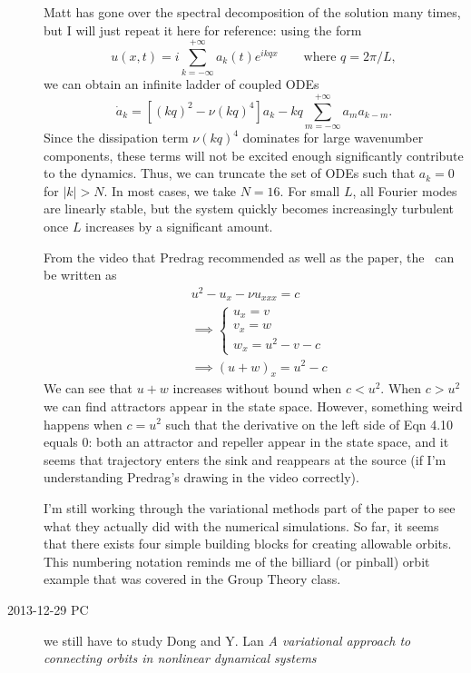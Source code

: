 \begin{description}
{Matt has gone over the spectral decomposition of the solution many times, but I
will just repeat it here for reference: using the form
\begin{equation}
    u(x,t) = i \sum_{k=-\infty}^{+\infty} a_k(t) e^{ikqx} \qquad \text{where } q = 2\pi/L,
\end{equation}
we can obtain an infinite ladder of coupled ODEs
\begin{equation}
    \dot{a}_k = [(kq)^2 - \nu (kq)^4] a_k - kq \sum_{m=-\infty}^{+\infty} a_m a_{k-m}.
\end{equation}
Since the dissipation term $\nu (kq)^4$ dominates for large wavenumber components, these
terms will not be excited enough significantly contribute to the dynamics. Thus, we can
truncate the set of ODEs such that $a_k = 0$ for $|k|>N$. In most cases, we take $N = 16$.
For small $L$, all Fourier modes are linearly stable, but the system quickly becomes
increasingly turbulent once $L$ increases by a significant amount.

From the video that Predrag recommended as well as the paper, the \KSe\ can be written as
\begin{align}
    &u^2 - u_x - \nu u_{xxx} = c\\
    &\implies \left\{
    \begin{array}{l}
	u_x = v\\
	v_x = w\\
	w_x = u^2 - v - c
    \end{array}
    \right.\\
    &\implies (u+w)_x = u^2 - c
\end{align}
We can see that $u+w$ increases without bound when $c<u^2$. When $c>u^2$ we can find
attractors appear in the state space. However, something weird happens when $c = u^2$
such that the derivative on the left side of Eqn 4.10 equals 0: both an attractor and
repeller appear in the state space, and it seems that trajectory enters the sink and
reappears at the source (if I'm understanding Predrag's drawing in the video correctly).

I'm still working through the variational methods part of the paper to see what they
actually did with the numerical simulations. So far, it seems that there exists four
simple building blocks for creating allowable orbits. This numbering notation reminds
me of the billiard (or pinball) orbit example that was covered in the Group Theory
class.
}

\item[2013-12-29 PC] we still have to study
Dong and Y. Lan
{\em A variational approach to connecting orbits in nonlinear dynamical systems }

\end{description}

